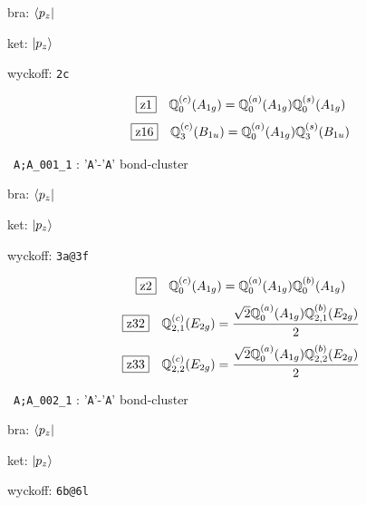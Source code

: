 \documentclass[fleqn,10pt,landscape]{jsarticle}
\begin{document}
\noindent\quad * bra: $\bra{p_{z}}$

\noindent\quad * ket: $\ket{p_{z}}$

\noindent\quad * wyckoff: \texttt{2c}

\begin{dmath*}
\hspace*{3mm}\fbox{z1}\quad \mathbb{Q}_{0}^{(c)}(A_{1g})=\mathbb{Q}_{0}^{(a)}(A_{1g}) \mathbb{Q}_{0}^{(s)}(A_{1g})
\end{dmath*}
\begin{dmath*}
\hspace*{3mm}\fbox{z16}\quad \mathbb{Q}_{3}^{(c)}(B_{1u})=\mathbb{Q}_{0}^{(a)}(A_{1g}) \mathbb{Q}_{3}^{(s)}(B_{1u})
\end{dmath*}
\vspace{5mm}

\noindent\textbullet\, \texttt{A;A_001_1} : '\texttt{A}'-'\texttt{A}' bond-cluster

\noindent\quad * bra: $\bra{p_{z}}$

\noindent\quad * ket: $\ket{p_{z}}$

\noindent\quad * wyckoff: \texttt{3a@3f}

\begin{dmath*}
\hspace*{3mm}\fbox{z2}\quad \mathbb{Q}_{0}^{(c)}(A_{1g})=\mathbb{Q}_{0}^{(a)}(A_{1g}) \mathbb{Q}_{0}^{(b)}(A_{1g})
\end{dmath*}
\begin{dmath*}
\hspace*{3mm}\fbox{z32}\quad \mathbb{Q}_{2,1}^{(c)}(E_{2g})=\frac{\sqrt{2} \mathbb{Q}_{0}^{(a)}(A_{1g}) \mathbb{Q}_{2,1}^{(b)}(E_{2g})}{2}
\end{dmath*}
\begin{dmath*}
\hspace*{3mm}\fbox{z33}\quad \mathbb{Q}_{2,2}^{(c)}(E_{2g})=\frac{\sqrt{2} \mathbb{Q}_{0}^{(a)}(A_{1g}) \mathbb{Q}_{2,2}^{(b)}(E_{2g})}{2}
\end{dmath*}
\vspace{5mm}

\noindent\textbullet\, \texttt{A;A_002_1} : '\texttt{A}'-'\texttt{A}' bond-cluster

\noindent\quad * bra: $\bra{p_{z}}$

\noindent\quad * ket: $\ket{p_{z}}$

\noindent\quad * wyckoff: \texttt{6b@6l}
\end{document}
